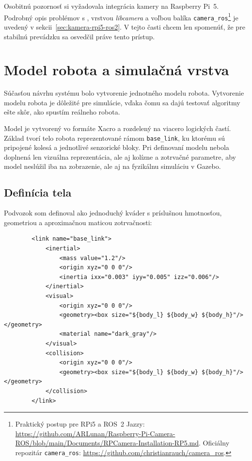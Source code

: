         Osobitnú pozornosť si vyžadovala integrácia kamery na Raspberry Pi~5. Podrobný opis problémov s , vrstvou \emph{libcamera} a voľbou balíka \texttt{camera\_ros}\footnote{Praktický postup pre RPi5 a ROS~2 Jazzy: \url{https://github.com/ARLunan/Raspberry-Pi-Camera-ROS/blob/main/Documents/RPCamera-Installation-RP5.md}. Oficiálny repozitár \texttt{camera\_ros}: \url{https://github.com/christianrauch/camera_ros}.} je uvedený v sekcii~\ref{sec:kamera-rpi5-ros2}. V tejto časti chcem len spomenúť, že pre stabilnú prevádzku sa osvedčil práve tento prístup.
      
        \section{Model robota a simulačná vrstva}
        \label{sec:sim-gazebo}
      
        Súčasťou návrhu systému bolo vytvorenie jednotného modelu robota. Vytvorenie modelu robota je dôležité pre simulácie, vďaka čomu sa dajú testovať algoritmy ešte skôr, ako spustím reálneho robota.
      
        Model je vytvorený vo formáte Xacro a rozdelený na viacero logických častí. Základ tvorí telo robota reprezentované rámom \texttt{base\_link}, ku ktorému sú pripojené kolesá a jednotlivé senzorické bloky. Pri definovaní modelu nebola doplnená len vizuálna reprezentácia, ale aj kolízne a zotrvačné parametre, aby model neslúžil iba na zobrazenie, ale aj na fyzikálnu simuláciu v Gazebo.
      
        \subsection{Definícia tela}
      
        Podvozok som definoval ako jednoduchý kváder s príslušnou hmotnosťou, geometriou a aproximačnou maticou zotrvačnosti:
      
        \begin{verbatim}
        <link name="base_link">
            <inertial>
                <mass value="1.2"/>
                <origin xyz="0 0 0"/>
                <inertia ixx="0.003" iyy="0.005" izz="0.006"/>
            </inertial>
            <visual>
                <origin xyz="0 0 0"/>
                <geometry><box size="${body_l} ${body_w} ${body_h}"/></geometry>
                <material name="dark_gray"/>
            </visual>
            <collision>
                <origin xyz="0 0 0"/>
                <geometry><box size="${body_l} ${body_w} ${body_h}"/></geometry>
            </collision>
        </link>
        \end{verbatim}
      
